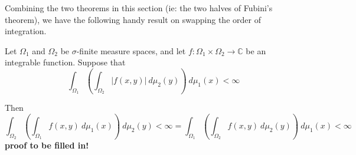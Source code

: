 Combining the two theorems in this section (ie: the two halves of Fubini's theorem), we have the following handy result on swapping the order of integration.

\begin{corollary}
Let $\Omega_1$ and $\Omega_2$ be $\sigma$-finite measure spaces, and let $f\colon \Omega_1 \times \Omega_2 \rightarrow {\mathbb C}$ be an integrable function.  Suppose that
$$\int_{\Omega_1} \left( \int_{\Omega_2}  |f (x,y)| \ d\mu_2 (y) \right) \ d\mu_1 (x) <\infty$$

Then
$$\int_{\Omega_2} \left( \int_{\Omega_1} f (x,y) \ d\mu_1 (x) \right) \ d\mu_2 (y)< \infty = \int_{\Omega_1} \left( \int_{\Omega_2}  f (x,y) \ d\mu_2 (y) \right) \ d\mu_1 (x) <\infty$$
\textbf{proof to be filled in!}
\end{corollary}





